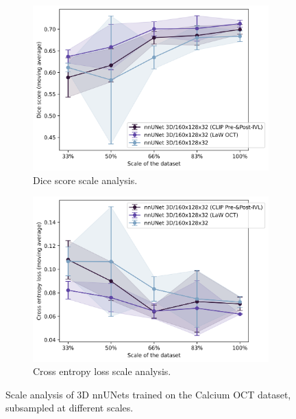 \documentclass[a4paper,11pt,oneside]{report}
\begin{document}
\begin{figure}[hbt]
    \centering
    \begin{subfigure}[t]{0.49\textwidth}
        \includegraphics[width=1\linewidth]{figures/discussion_scale_analysis.png}
        \caption{Dice score scale analysis.}
        \label{fig:scale-analysis}
    \end{subfigure}%
    \begin{subfigure}[t]{0.49\textwidth}
        \includegraphics[width=1\linewidth]{figures/discussion_cross_entropy_scale_analysis.png}
        \caption{Cross entropy loss scale analysis.}
        \label{fig:cross-entropy-scale-analysis}
    \end{subfigure}
    \caption{Scale analysis of 3D nnUNets trained on the Calcium OCT dataset, subsampled at different scales.}
\end{figure}
\end{document}
